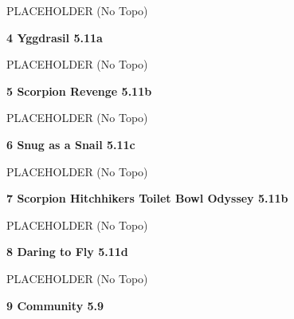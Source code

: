 \begin{multicols}{2}
\begin{adjustwidth}{0.5cm}{}
\begin{adjustwidth}{0.5cm}{}			
PLACEHOLDER (No Topo)
\end{adjustwidth}


\end{adjustwidth}


\needspace{1.5cm}
\label{rt:Yggdrasil}
\colorbox{RoyalBlue!20}{
\parbox{0.95\linewidth}{
\textbf{
4 Yggdrasil 5.11a  
}}}

\begin{adjustwidth}{0.5cm}{}			
PLACEHOLDER (No Topo)
\end{adjustwidth}



\needspace{1.5cm}
\label{rt:Scorpion Revenge}
\colorbox{RoyalBlue!20}{
\parbox{0.95\linewidth}{
\textbf{
5 Scorpion Revenge 5.11b  
}}}

\begin{adjustwidth}{0.5cm}{}			
PLACEHOLDER (No Topo)
\end{adjustwidth}



\needspace{1.5cm}
\label{rt:Snug as a Snail}
\colorbox{RoyalBlue!20}{
\parbox{0.95\linewidth}{
\textbf{
6 Snug as a Snail 5.11c  
}}}

\begin{adjustwidth}{0.5cm}{}			
PLACEHOLDER (No Topo)
\end{adjustwidth}



\needspace{1.5cm}
\label{rt:Scorpion Hitchhikers Toilet Bowl Odyssey}
\colorbox{RoyalBlue!20}{
\parbox{0.95\linewidth}{
\textbf{
7 Scorpion Hitchhikers Toilet Bowl Odyssey 5.11b  
}}}

\begin{adjustwidth}{0.5cm}{}			
PLACEHOLDER (No Topo)
\end{adjustwidth}



\needspace{1.5cm}
\label{rt:Daring to Fly}
\colorbox{RoyalBlue!20}{
\parbox{0.95\linewidth}{
\textbf{
8 Daring to Fly 5.11d  
}}}

\begin{adjustwidth}{0.5cm}{}			
PLACEHOLDER (No Topo)
\end{adjustwidth}



\needspace{1.5cm}
\label{rt:Community}
\colorbox{green!20}{
\parbox{0.95\linewidth}{
\textbf{
9 Community 5.9  
}}}


\end{multicols}
